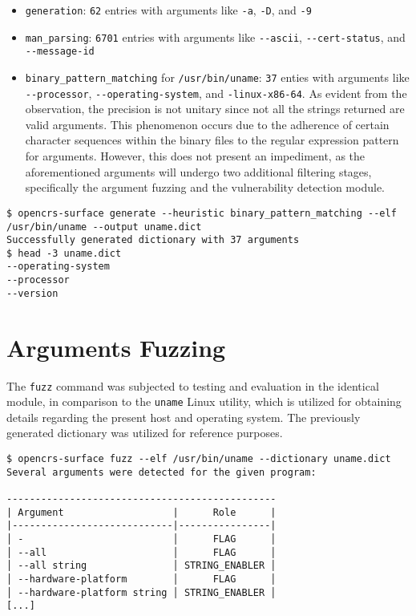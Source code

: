 \documentclass[../main.tex]{subfiles}
\begin{document}
\begin{itemize}
  \tightlist
  \item
        \texttt{generation}: \texttt{62} entries with arguments like
        \texttt{-a}, \texttt{-D}, and \texttt{-9}
  \item
        \texttt{man\_parsing}: \texttt{6701} entries with arguments like
        \texttt{-\/-ascii}, \texttt{-\/-cert-status}, and \\
        \texttt{-\/-message-id}
  \item
        \texttt{binary\_pattern\_matching} for \texttt{/usr/bin/uname}:
        \texttt{37} enties with arguments like \\ \texttt{-\/-processor}, \texttt{-\/-operating-system}, and \texttt{-linux-x86-64}. As evident from the
        observation, the precision is not unitary since not all the strings
        returned are valid arguments. This phenomenon occurs due to the
        adherence of certain character sequences within the binary files to
        the regular expression pattern for arguments. However, this does not
        present an impediment, as the aforementioned arguments will undergo
        two additional filtering stages, specifically the argument fuzzing and
        the vulnerability detection module.
\end{itemize}

\begin{tiny}
\begin{verbatim}
$ opencrs-surface generate --heuristic binary_pattern_matching --elf /usr/bin/uname --output uname.dict
Successfully generated dictionary with 37 arguments
$ head -3 uname.dict
--operating-system
--processor
--version
\end{verbatim}
\end{tiny}

\hypertarget{arguments-fuzzing}{%
  \section{Arguments Fuzzing}\label{arguments-fuzzing}}

The \texttt{fuzz} command was subjected to testing and evaluation in the
identical module, in comparison to the \texttt{uname} Linux utility, which is
utilized for obtaining details regarding the present host and operating system.
The previously generated dictionary was utilized for reference purposes.

\begin{tiny}
\begin{verbatim}
$ opencrs-surface fuzz --elf /usr/bin/uname --dictionary uname.dict
Several arguments were detected for the given program:

-----------------------------------------------
| Argument                   |      Role      |
|----------------------------|----------------|
│ -                          │      FLAG      │
│ --all                      │      FLAG      │
│ --all string               │ STRING_ENABLER │
│ --hardware-platform        │      FLAG      │
│ --hardware-platform string │ STRING_ENABLER │
[...]
\end{verbatim}
\end{tiny}
\end{document}
